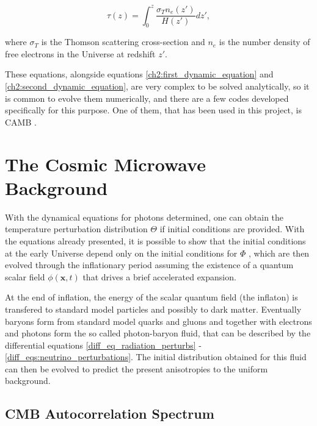 \documentclass[openany,a4paper,12pt,oneside]{book}
\begin{document}
\begin{spacing}{1.5}
\begin{equation}\label{def:optical_depth}
	\tau(z)=\int_0^z \frac{\sigma_T n_e(z')}{H(z')} dz',
\end{equation}

\noindent where $\sigma_T$ is the Thomson scattering cross-section and $n_e$ is the number density of free electrons in the Universe at redshift $z'$.

These equations, alongside equations \eqref{ch2:first_dynamic_equation} and \eqref{ch2:second_dynamic_equation}, are very complex to be solved analytically, so it is common to evolve them numerically, and there are a few codes developed specifically for this purpose. One of them, that has been used in this project, is CAMB \cite{CAMB:Lewis1999bs, CAMB:Lewis2002ah}.

\section{The Cosmic Microwave Background}

With the dynamical equations for photons determined, one can obtain the temperature perturbation distribution $\Theta$ if initial conditions are provided. With the equations already presented, it is possible to show that the initial conditions at the early Universe depend only on the initial conditions for $\Phi$ \cite{dodelson2020modern}, which are then evolved through the inflationary period assuming the existence of a quantum scalar field $\phi(\mathbf{x}, t)$ that drives a brief accelerated expansion. 

At the end of inflation, the energy of the scalar quantum field (the inflaton) is transfered to standard model particles and possibly to dark matter. Eventually baryons form from standard model quarks and gluons and together with electrons and photons form the so called photon-baryon fluid, that can be described by the differential equations \eqref{diff_eq_radiation_perturbs} - \eqref{diff_eqs:neutrino_perturbations}. The initial distribution obtained for this fluid can then be evolved to predict the present anisotropies to the uniform background. %

\subsection{CMB Autocorrelation Spectrum}


\end{spacing}
\end{document}

